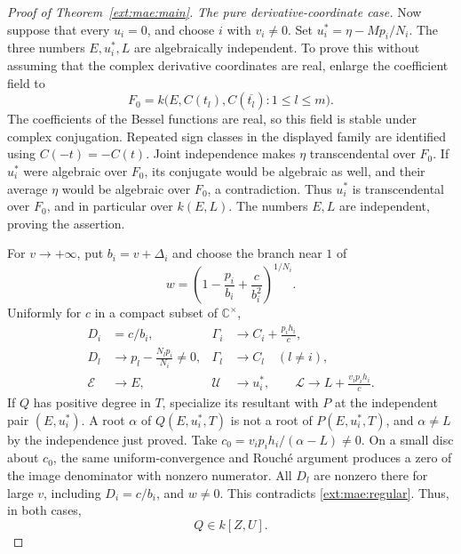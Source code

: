 \documentclass[11pt,a4paper]{article}
\theoremstyle{definition}\newtheorem{definition}[theorem]{Definition}
\theoremstyle{remark}\newtheorem{remark}[theorem]{Remark}
\begin{document}
\begin{proof}[Proof of Theorem~\ref{ext:mae:main}]
\emph{The pure derivative-coordinate case.}
Now suppose that every $u_i=0$, and choose $i$ with $v_i\ne0$.
Set $u_i^*=\eta-Mp_i/N_i$.  The three numbers $E,u_i^*,L$ are
algebraically independent.  To prove this without assuming that the
complex derivative coordinates are real, enlarge the coefficient field to
\[
 F_0=k\bigl(E,C(t_l),C(\overline{t_l}):1\le l\le m\bigr).
\]
The coefficients of the Bessel functions are real, so this field is
stable under complex conjugation.  Repeated sign classes in the displayed
family are identified using $C(-t)=-C(t)$.  Joint independence makes
$\eta$ transcendental over $F_0$.  If $u_i^*$ were algebraic over
$F_0$, its conjugate would be algebraic as well, and their average
$\eta$ would be algebraic over $F_0$, a contradiction.  Thus $u_i^*$
is transcendental over $F_0$, and in particular over $k(E,L)$.
The numbers $E,L$ are independent, proving the assertion.

For $v\to+\infty$, put $b_i=v+\Delta_i$ and choose the branch near $1$ of
\[
 w=\left(1-\frac{p_i}{b_i}+\frac{c}{b_i^2}\right)^{1/N_i}.
\]
Uniformly for $c$ in a compact subset of $\mathbb C^\times$,
\begin{align*}
 D_i&=c/b_i,&
 \Gamma_i&\longrightarrow C_i+\frac{p_i h_i}{c},\\
 D_l&\longrightarrow p_l-\frac{N_lp_i}{N_i}\ne0,
 &\Gamma_l&\longrightarrow C_l\quad(l\ne i),\\
 \mathcal E&\longrightarrow E,&
 \mathcal U&\longrightarrow u_i^*,\qquad
 \mathcal L\longrightarrow L+\frac{v_i p_i h_i}{c}.
\end{align*}
If $Q$ has positive degree in $T$, specialize its resultant with $P$
at the independent pair $(E,u_i^*)$.  A root $\alpha$ of
$Q(E,u_i^*,T)$ is not a root of $P(E,u_i^*,T)$, and $\alpha\ne L$
by the independence just proved.  Take
$c_0=v_i p_i h_i/(\alpha-L)\ne0$.  On a small disc about $c_0$,
the same uniform-convergence and Rouch\'e argument produces a zero
of the image denominator with nonzero numerator.  All $D_l$ are
nonzero there for large $v$, including $D_i=c/b_i$, and $w\ne0$.
This contradicts \eqref{ext:mae:regular}.  Thus, in both cases,
\begin{equation}
                              Q\in k[Z,U].
 \label{ext:mae:no-T-denominator}
\end{equation}


\end{proof}
\end{document}
